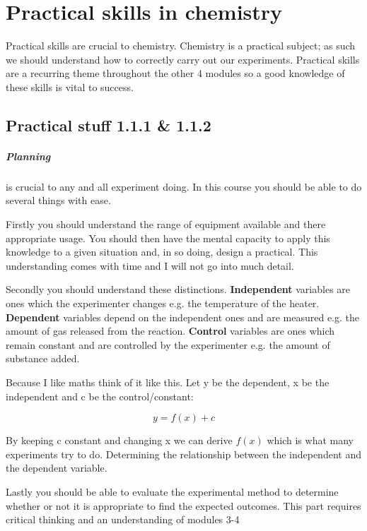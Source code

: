 \chapter{Practical skills in chemistry}
	Practical skills are crucial to chemistry.
	Chemistry is a practical subject; as such we should understand how to correctly carry out our experiments.
	Practical skills are a recurring theme throughout the other 4 modules so a good knowledge of these skills is vital to success.

\section{Practical stuff 1.1.1 \& 1.1.2}
	\paragraph{Planning} is crucial to any and all experiment doing.
	In this course you should be able to do several things with ease.
	
	Firstly you should understand the range of equipment available and there appropriate usage.
	You should then have the mental capacity to apply this knowledge to a given situation and, in so doing, design a practical.
	This understanding comes with time and I will not go into much detail.
	
	Secondly you should understand these distinctions.
	\textbf{Independent} variables are ones which the experimenter changes e.g. the temperature of the heater.
	\textbf{Dependent} variables depend on the independent ones and are measured e.g. the amount of gas released from the reaction.
	\textbf{Control} variables are ones which remain constant and are controlled by the experimenter e.g. the amount of substance added.
	
	Because I like maths think of it like this. Let y be the dependent, x be the independent and c be the control/constant:
	
	\begin{center}
	\[y= f(x) + c\]
	\end{center}
	
	By keeping c constant and changing x we can derive $f(x)$ which is what many experiments try to do.
	Determining the relationship between the independent and the dependent variable.
	
	Lastly you should be able to evaluate the experimental method to determine whether or not it is appropriate to find the expected outcomes.
	This part requires critical thinking and an understanding of modules 3-4
	
